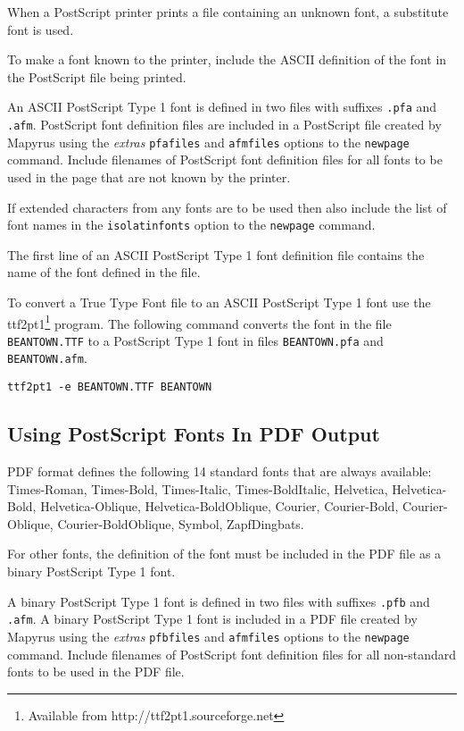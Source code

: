 When a PostScript printer prints a file containing an unknown font,
a substitute font is used.

To make a font known to the printer, include the ASCII definition of
the font in the PostScript file being printed.

An ASCII PostScript Type 1 font is defined in two files with suffixes
\texttt{.pfa} and \texttt{.afm}.  PostScript
font definition files are included in a PostScript file created
by Mapyrus using the
\textit{extras} \texttt{pfafiles} and \texttt{afmfiles}
options to the \texttt{newpage} command.
Include filenames of PostScript font definition files for all fonts to be used
in the page that are not known by the printer.

If extended characters from any fonts are to be used then also
include the list of font names in the \texttt{isolatinfonts} option
to the \texttt{newpage} command.

The first line of an ASCII PostScript Type 1 font definition file
contains the name of the font defined in the file.

To convert a True Type Font file to an ASCII PostScript Type 1 font use the
ttf2pt1\footnote{Available from http://ttf2pt1.sourceforge.net} program.  The
following command converts the font in the file \texttt{BEANTOWN.TTF} to a
PostScript Type 1 font in files
\texttt{BEANTOWN.pfa} and
\texttt{BEANTOWN.afm}.

\begin{verbatim}
ttf2pt1 -e BEANTOWN.TTF BEANTOWN
\end{verbatim}

\subsection{Using PostScript Fonts In PDF Output}
\label{pdffonts}

PDF format defines the following 14 standard fonts
that are always available:
Times-Roman, Times-Bold, Times-Italic, Times-BoldItalic,
Helvetica, Helvetica-Bold, Helvetica-Oblique, Helvetica-BoldOblique,
Courier, Courier-Bold, Courier-Oblique, Courier-BoldOblique,
Symbol, ZapfDingbats.

For other fonts, the definition of the font must be included
in the PDF file as a binary PostScript Type 1 font.

A binary PostScript Type 1 font is defined in two files with suffixes
\texttt{.pfb} and \texttt{.afm}.  A binary PostScript Type 1
font is included in a PDF file created
by Mapyrus using the
\textit{extras} \texttt{pfbfiles} and \texttt{afmfiles}
options to the \texttt{newpage} command.
Include filenames of PostScript font definition files for all
non-standard fonts to be used in the PDF file.

